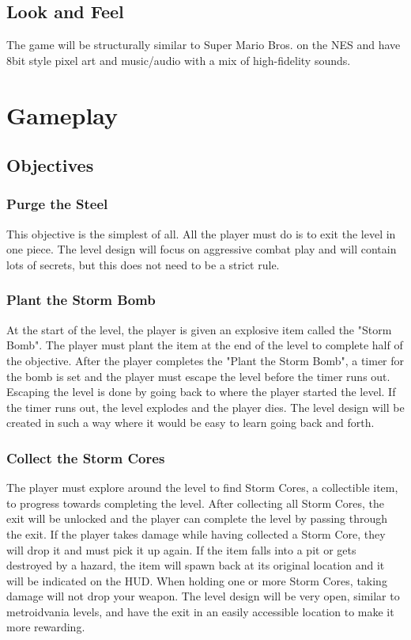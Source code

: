 \documentclass[12pt]{article}
\begin{document}
\subsection{Look and Feel}

The game will be structurally similar to Super Mario Bros. on the NES and have 8bit style pixel art and music/audio with a mix of high-fidelity sounds. 

\section{Gameplay}

\subsection{Objectives}

\subsubsection{Purge the Steel}

This objective is the simplest of all. All the player must do is to exit the level in one piece. The level design will focus on aggressive combat play and will contain lots of secrets, but this does not need to be a strict rule. 

\subsubsection{Plant the Storm Bomb}

At the start of the level, the player is given an explosive item called the "Storm Bomb". The player must plant the item at the end of the level to complete half of the objective. After the player completes the "Plant the Storm Bomb", a timer for the bomb is set and the player must escape the level before the timer runs out. Escaping the level is done by going back to where the player started the level. If the timer runs out, the level explodes and the player dies. The level design will be created in such a way where it would be easy to learn going back and forth.

\subsubsection{Collect the Storm Cores}

The player must explore around the level to find Storm Cores, a collectible item, to progress towards completing the level. After collecting all Storm Cores, the exit will be unlocked and the player can complete the level by passing through the exit. If the player takes damage while having collected a Storm Core, they will drop it and must pick it up again. If the item falls into a pit or gets destroyed by a hazard, the item will spawn back at its original location and it will be indicated on the HUD. When holding one or more Storm Cores, taking damage will not drop your weapon. The level design will be very open, similar to metroidvania levels, and have the exit in an easily accessible location to make it more rewarding. 
\end{document}
